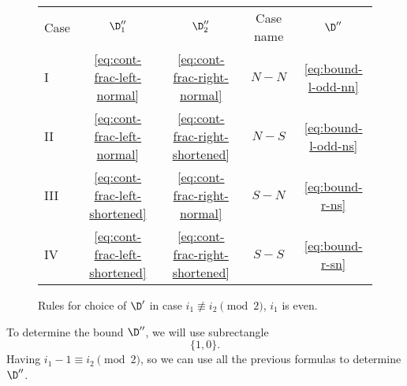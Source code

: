 \begin{figure}[ht]
	\centering
	\begin{tabular}{| l | c c c | c |}
		\cline{1-5}
		Case & $\D_1''$ & $\D_2''$ & Case name & $\D''$ \\
		\cline{1-5}
			I &
			\ref{eq:cont-frac-left-normal} &
			\ref{eq:cont-frac-right-normal} &
			$N-N$ &
			\ref{eq:bound-l-odd-nn}
		\\
			II &
			\ref{eq:cont-frac-left-normal} &
			\ref{eq:cont-frac-right-shortened} &
			$N-S$ &
			\ref{eq:bound-l-odd-ns}
		\\
			III &
			\ref{eq:cont-frac-left-shortened} &
			\ref{eq:cont-frac-right-normal} &
			$S-N$ &
			\ref{eq:bound-r-ns}
		\\
			IV &
			\ref{eq:cont-frac-left-shortened} &
			\ref{eq:cont-frac-right-shortened} &
			$S-S$ &
			\ref{eq:bound-r-sn}
		\\
		\cline{1-5}
	\end{tabular}
	\caption{Rules for choice of $\D'$ in case $i_1 \not\equiv i_2 \pmod 2$, $i_1$ is even.}
	\label{fg:rectangle-l-odd-bound-choice}
\end{figure}

To determine the bound $\D''$, we will use subrectangle
\begin{equation*}
	\{1, 0\}.
\end{equation*}
Having $i_1 - 1 \equiv i_2 \pmod 2$, so we can use all the previous formulas to determine $\D''$.
